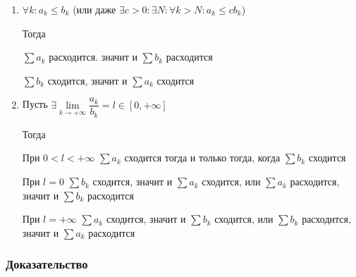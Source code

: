 \documentclass{article}
\begin{document}
                \begin{enumerate}
                
                    \item $\forall k : a_k \leq b_k$ (или даже $\exists c > 0 : \exists N : \forall k > N : a_k \leq c b_k$)
                    
                        Тогда
                        
                            $\sum a_k$ расходится. значит и $\sum b_k$ расходится
                            
                            $\sum b_k$ сходится, значит и $\sum a_k$ сходится
                            
                    \item Пусть $\exists \lim\limits_{k \rightarrow +\infty} \dfrac{a_k}{b_k} = l \in [0, +\infty]$
                    
                        Тогда
                        
                            При $0 < l < +\infty$ $\sum a_k$ сходится тогда и только тогда, когда $\sum b_k$ сходится
                            
                            При $l = 0$ $\sum b_k$ сходится, значит и $\sum a_k$ сходится, или $\sum a_k$ расходится, значит и $\sum b_k$ расходится
                            
                            При $l = +\infty$ $\sum a_k$ сходится, значит и $\sum b_k$ сходится, или $\sum b_k$ расходится, значит и $\sum a_k$ расходится
                            
                \end{enumerate}
                
            \subsubsection{Доказательство}
            
\end{document}
